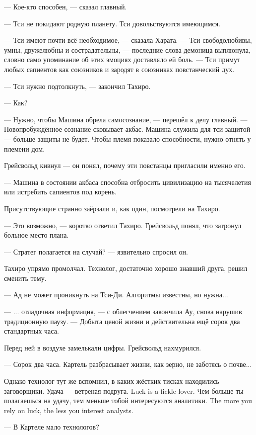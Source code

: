--- Кое-кто способен, --- сказал главный.

--- Тси не покидают родную планету.
Тси довольствуются имеющимся.

--- Тси имеют почти всё необходимое, --- сказала Харата.
--- Тси свободолюбивы, умны, дружелюбны и сострадательны, --- последние слова демоница выплюнула, словно само упоминание об этих эмоциях доставляло ей боль.
--- Тси примут любых сапиентов как союзников и зародят в союзниках повстанческий дух.

--- Тси нужно подтолкнуть, --- закончил Тахиро.

--- Как?

--- Нужно, чтобы Машина обрела самосознание, --- перешёл к делу главный.
--- Новопробуждённое сознание сковывает акбас.
Машина служила для тси защитой --- больше защиты не будет.
Чтобы племя показало способности, нужно отнять у племени дом.

Грейсвольд кивнул --- он понял, почему эти повстанцы пригласили именно его.

--- Машина в состоянии акбаса способна отбросить цивилизацию на тысячелетия или истребить сапиентов под корень.

Присутствующие странно заёрзали и, как один, посмотрели на Тахиро.

--- Это возможно, --- коротко ответил Тахиро.
Грейсвольд понял, что затронул больное место плана.

--- Стратег полагается на случай? --- язвительно спросил он.

Тахиро упрямо промолчал.
Технолог, достаточно хорошо знавший друга, решил сменить тему.

--- Ад не может проникнуть на Тси-Ди.
Алгоритмы известны, но нужна...

--- ... отладочная информация, --- с облегчением закончила Ау, снова нарушив традиционную паузу.
--- Добыта ценой жизни и действительна ещё сорок два стандартных часа.

Перед ней в воздухе замелькали цифры.
Грейсвольд нахмурился.

--- Сорок два часа.
Картель разбрасывает жизни, как зерно, не заботясь о почве...

Однако технолог тут же вспомнил, в каких жёстких тисках находились заговорщики.
{Удача --- ветреная подруга.}
{Luck is a fickle lover.}
{Чем больше ты полагаешься на удачу, тем меньше тобой интересуются аналитики.}
{The more you rely on luck, the less you interest analysts.}

--- В Картеле мало технологов?

